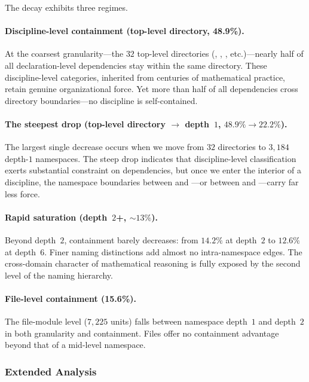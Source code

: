 The decay exhibits three regimes.

\paragraph{Discipline-level containment (top-level directory, 48.9\%).} At the coarsest granularity---the $32$ top-level directories (, , , etc.)---nearly half of all declaration-level dependencies stay within the same directory. These discipline-level categories, inherited from centuries of mathematical practice, retain genuine organizational force. Yet more than half of all dependencies cross directory boundaries---no discipline is self-contained.

\paragraph{The steepest drop (top-level directory $\to$ depth~$1$, $48.9\% \to 22.2\%$).} The largest single decrease occurs when we move from $32$ directories to $3{,}184$ depth-$1$ namespaces. The steep drop indicates that discipline-level classification exerts substantial constraint on dependencies, but once we enter the interior of a discipline, the namespace boundaries between  and ---or between  and ---carry far less force.

\paragraph{Rapid saturation (depth~$2$+, ${\sim}13\%$).} Beyond depth~$2$, containment barely decreases: from $14.2\%$ at depth~$2$ to $12.6\%$ at depth~$6$. Finer naming distinctions add almost no intra-namespace edges. The cross-domain character of mathematical reasoning is fully exposed by the second level of the naming hierarchy.

\paragraph{File-level containment (15.6\%).} The file-module level ($7{,}225$ units) falls between namespace depth~$1$ and depth~$2$ in both granularity and containment. Files offer no containment advantage beyond that of a mid-level namespace.

\subsubsection{Extended Analysis}\label{app:ns-analysis}

